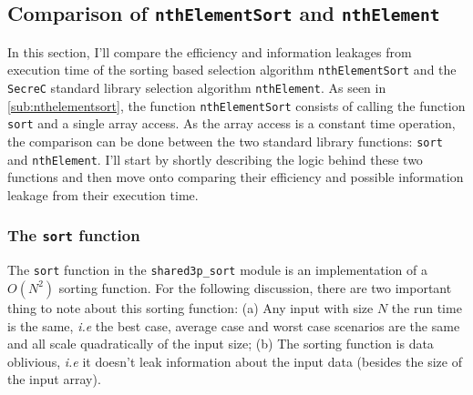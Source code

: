 \documentclass[11pt]{article}
\newcommand{\ct}[1]{\texttt{#1}}
\newcommand{\SC}{\ct{SecreC}\xspace}
\begin{document}



\subsection{Comparison of \ct{nthElementSort} and \ct{nthElement}} %
\label{sub:comparison_of_nthelementsort_and_nthelement}

In this section, I'll compare the efficiency and information leakages from execution time of the sorting based selection algorithm \ct{nthElementSort} and the \SC standard library selection algorithm \ct{nthElement}. As seen in \cref{sub:nthelementsort}, the function \ct{nthElementSort} consists of calling the function \ct{sort} and a single array access. As the array access is a constant time operation, the comparison can be done between the two standard library functions: \ct{sort} and \ct{nthElement}. I'll start by shortly describing the logic behind these two functions and then move onto comparing their efficiency and possible information leakage from their execution time.

\subsubsection{The \ct{sort} function} %
\label{ssub:the_sort_function}
 
The \ct{sort} function in the \ct{shared3p\_sort} module is an implementation of a $O(N^2)$ sorting function. For the following discussion, there are two important thing to note about this sorting function: (a) Any input with size $N$ the run time is the same, \emph{i.e} the best case, average case and worst case scenarios are the same and all scale quadratically of the input size; (b) The sorting function is data oblivious, \emph{i.e} it doesn't leak information about the input data (besides the size of the input array).  
\end{document}
